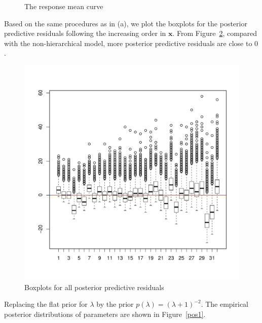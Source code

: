 \documentclass[]{article}
\begin{document}
\begin{enumerate}
{\begin{itemize}
\begin{figure}[ht!]
				\caption{The response mean curve}
				\label{RMC0}
			\end{figure}
			Based on the same procedures as in (a), we plot the boxplots for the posterior predictive residuals following the increasing order in $\bm x$. From Figure~\ref{box0}, compared with the non-hierarchical model, more posterior predictive residuals are close to $0$.\par
			\begin{figure}[ht!]
				\centering
				\includegraphics[scale = 0.4]{"pic/HW5_1/box0"}
				\caption{Boxplots for all posterior predictive residuals}
				\label{box0}
			\end{figure}
			Replacing the flat prior for $\lambda$ by the prior $p(\lambda) = (\lambda+1)^{-2}$. The empirical posterior distributions of parameters are shown in Figure~\ref{pos1}.
			\begin{figure}[ht!]
				\centering

\end{figure}
\end{itemize}}
\end{enumerate}
\end{document}
